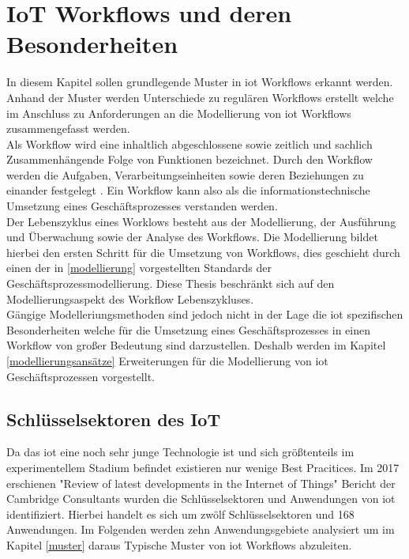 \documentclass[a4paper, 12pt, twoside, headsepline=true]{scrartcl} %
\begin{document}
\newpage

\section{IoT Workflows und deren Besonderheiten}
In diesem Kapitel sollen grundlegende Muster in \ac{iot} Workflows erkannt werden. Anhand der Muster werden Unterschiede zu regulären Workflows erstellt welche im Anschluss zu Anforderungen an die Modellierung von \ac{iot} Workflows zusammengefasst werden. \\
Als Workflow wird eine inhaltlich abgeschlossene sowie zeitlich und sachlich Zusammenhängende Folge von Funktionen bezeichnet. Durch den Workflow werden die Aufgaben, Verarbeitungseinheiten sowie deren Beziehungen zu einander festgelegt \cite{workflowgabler}. Ein Workflow kann also als die informationstechnische Umsetzung eines Geschäftsprozesses verstanden werden. \\
Der Lebenszyklus eines Worklows besteht aus der Modellierung, der Ausführung und Überwachung sowie der Analyse des Workflows. Die Modellierung bildet hierbei den ersten Schritt für die Umsetzung von Workflows, dies geschieht durch einen der in \ref{modellierung} vorgestellten Standards der Geschäftsprozessmodellierung. Diese Thesis beschränkt sich auf den Modellierungsaspekt des Workflow Lebenszykluses.\\
Gängige Modelleriungsmethoden sind jedoch nicht in der Lage die \ac{iot} spezifischen Besonderheiten welche für die Umsetzung eines Geschäftsprozesses in einen Workflow von großer Bedeutung sind darzustellen. Deshalb werden im Kapitel \ref{modellierungsansätze} Erweiterungen für die Modellierung von \ac{iot} Geschäftsprozessen vorgestellt.


\subsection{Schlüsselsektoren des IoT} \label{iotmuster}
Da das \ac{iot} eine noch sehr junge Technologie ist und sich größtenteils im experimentellem Stadium befindet existieren nur wenige Best Pracitices. Im 2017 erschienen "Review of latest developments in the Internet of Things" Bericht der Cambridge Consultants wurden die Schlüsselsektoren und Anwendungen von \ac{iot} identifiziert. Hierbei handelt es sich um zwölf Schlüsselsektoren und 168 Anwendungen\cite[S.24-26]{iotDevelopments}. Im Folgenden werden zehn Anwendungsgebiete analysiert um im Kapitel \ref{muster} daraus Typische Muster von \ac{iot} Workflows abzuleiten.
\end{document}
